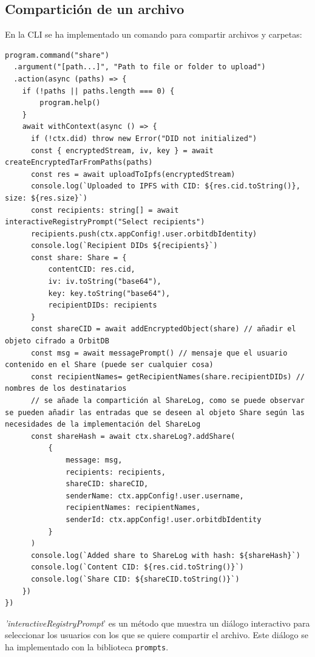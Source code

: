 \subsection{Compartición de un archivo}
En la CLI se ha implementado un comando para compartir archivos y carpetas:
\begin{verbatim}
program.command("share")
  .argument("[path...]", "Path to file or folder to upload")
  .action(async (paths) => {
    if (!paths || paths.length === 0) {
        program.help()
    }
    await withContext(async () => {
      if (!ctx.did) throw new Error("DID not initialized")
      const { encryptedStream, iv, key } = await createEncryptedTarFromPaths(paths)
      const res = await uploadToIpfs(encryptedStream)
      console.log(`Uploaded to IPFS with CID: ${res.cid.toString()}, size: ${res.size}`)
      const recipients: string[] = await interactiveRegistryPrompt("Select recipients")
      recipients.push(ctx.appConfig!.user.orbitdbIdentity)
      console.log(`Recipient DIDs ${recipients}`)
      const share: Share = {
          contentCID: res.cid, 
          iv: iv.toString("base64"), 
          key: key.toString("base64"), 
          recipientDIDs: recipients
      }
      const shareCID = await addEncryptedObject(share) // añadir el objeto cifrado a OrbitDB
      const msg = await messagePrompt() // mensaje que el usuario contenido en el Share (puede ser cualquier cosa)
      const recipientNames= getRecipientNames(share.recipientDIDs) // nombres de los destinatarios
      // se añade la compartición al ShareLog, como se puede observar se pueden añadir las entradas que se deseen al objeto Share según las necesidades de la implementación del ShareLog
      const shareHash = await ctx.shareLog?.addShare(
          {
              message: msg,
              recipients: recipients,
              shareCID: shareCID,
              senderName: ctx.appConfig!.user.username,
              recipientNames: recipientNames, 
              senderId: ctx.appConfig!.user.orbitdbIdentity
          }
      ) 
      console.log(`Added share to ShareLog with hash: ${shareHash}`)
      console.log(`Content CID: ${res.cid.toString()}`)
      console.log(`Share CID: ${shareCID.toString()}`)
    })
})
\end{verbatim}

\textit{'interactiveRegistryPrompt}' es un método que muestra un diálogo interactivo para seleccionar los usuarios con los que se quiere compartir el archivo. Este diálogo se ha implementado con la biblioteca \texttt{prompts}.


